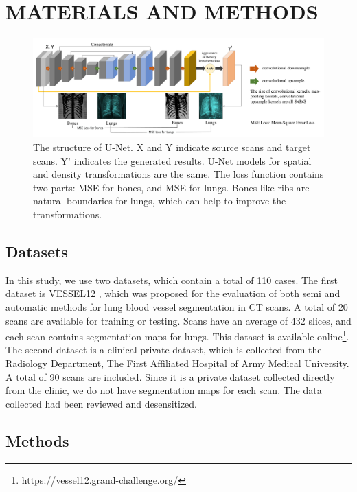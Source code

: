\documentclass{article}
\begin{document}
\section{MATERIALS AND METHODS}
\label{sec:materials}
\begin{figure}[htbp]
    \centerline{\includegraphics[width=180mm]{unet.pdf}}
    \vspace{-0.3cm}
    \caption{The structure of U-Net. X and Y indicate source scans and target scans. Y' indicates the generated results. U-Net models for spatial and density transformations are the same. The loss function contains two parts: MSE for bones, and MSE for lungs. Bones like ribs are natural boundaries for lungs, which can help to improve the transformations.
    }
    \vspace{-0.3cm}
    \label{unet}
    \end{figure}
\subsection{Datasets}
\label{dataset}
In this study, we use two datasets, which contain a total of 110 cases.
The first dataset is VESSEL12 \cite{rudyanto2014comparing}, which was proposed for the evaluation of both semi and automatic methods for lung blood vessel segmentation in CT scans. A total of 20 scans are available for training or testing. Scans have an average of 432 slices, and each scan contains segmentation maps for lungs. This dataset is available online\footnote{https://vessel12.grand-challenge.org/}.
The second dataset is a clinical private dataset, which is collected from the Radiology Department, The First Affiliated Hospital of Army Medical University. A total of 90 scans are included. Since it is a private dataset collected directly from the clinic, we do not have segmentation maps for each scan. The data collected had been reviewed and desensitized.

\subsection{Methods}
\label{methods}
\end{document}
